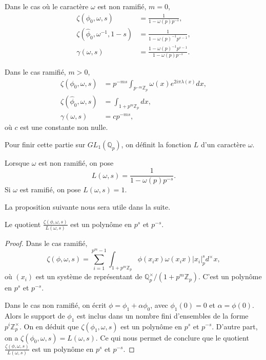 Dans le cas où le caractère $\omega$ est non ramifié, $m=0$,
\begin{align}
\zeta(\phi_0, \omega, s)&=\frac{1}{1-\omega(p)p^{-s}},\\
\zeta(\hat{\phi}_0, \omega^{-1}, 1-s) &= \frac{1}{1-\omega(p)^{-1}p^{s-1}}, \\
\gamma(\omega,s) &= \frac{1-\omega(p)^{-1}p^{s-1}}{1-\omega(p)p^{-s}}.
\end{align}

Dans le cas ramifié, $m > 0$,
\begin{align}
\zeta(\phi_0, \omega, s) &= p^{-ms}\int_{p^{-m}\mathbb{Z}_p} \omega(x)e^{2i\pi \lambda(x)}dx, \\
\zeta(\hat{\phi}_0, \omega, s) &= \int_{1+p^{m}\mathbb{Z}_p} dx, \\
\gamma(\omega,s) &= c p^{-ms},
\end{align}
où $c$ est une constante non nulle.

Pour finir cette partie sur $GL_1(\mathbb{Q}_p)$, on définit la fonction $L$ d'un caractère $\omega$.
\begin{definition}
Lorsque $\omega$ est non ramifié, on pose
\begin{equation}
L(\omega,s) = \frac{1}{1-\omega(p)p^{-s}}.
\end{equation}
Si $\omega$ est ramifié, on pose $L(\omega,s)=1$.
\end{definition}

La proposition suivante nous sera utile dans la suite.
\begin{proposition}
Le quotient $\frac{\zeta(\phi, \omega, s)}{L(\omega,s)}$ est un polynôme en $p^s$ et $p^{-s}$.
\end{proposition}

\begin{proof}
Dans le cas ramifié,
\begin{equation}
\zeta(\phi, \omega, s)=\sum_{i=1}^{p^{m}-1} \int_{1+p^{m}\mathbb{Z}_p} \phi(x_ix)\omega(x_ix)|x_i|_p^s d^\times x,
\end{equation}
où $(x_i)$ est un système de représentant de $\mathbb{Q}_p^\times/(1+p^m\mathbb{Z}_p)$. C'est un polynôme en $p^s$ et $p^{-s}$.

Dans le cas non ramifié, on écrit $\phi = \phi_1 + \alpha \phi_0$, avec $\phi_1(0)=0$ et $\alpha = \phi(0)$. Alors le support de $\phi_1$ est inclus dans un nombre fini d'ensembles de la forme $p^i \mathbb{Z}_p^\times$. On en déduit que $\zeta(\phi_1, \omega, s)$ est un polynôme en $p^s$ et $p^{-s}$. D'autre part, on a $\zeta(\phi_0, \omega, s) = L(\omega, s)$. Ce qui nous permet de conclure que le quotient $\frac{\zeta(\phi, \omega, s)}{L(\omega,s)}$ est un polynôme en $p^s$ et $p^{-s}$.
\end{proof}